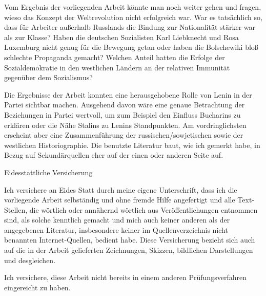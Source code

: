 \documentclass[12pt,headsepline,a4paper]{scrartcl}
\begin{document}
Vom Ergebnis der vorliegenden Arbeit könnte man noch weiter gehen und fragen, wieso das Konzept der Weltrevolution nicht erfolgreich war. War es tatsächlich so, dass für Arbeiter außerhalb Russlands die Bindung zur Nationalität stärker war als zur Klasse? Haben die deutschen Sozialisten Karl Liebknecht und Rosa Luxemburg nicht genug für die Bewegung getan oder haben die Bolschewiki bloß schlechte Propaganda gemacht? Welchen Anteil hatten die Erfolge der Sozialdemokratie in den westlichen Ländern an der relativen Immunität gegenüber dem Sozialismus?

Die Ergebnisse der Arbeit konnten eine herausgehobene Rolle von Lenin in der Partei sichtbar machen. Ausgehend davon wäre eine genaue Betrachtung der Beziehungen in Partei wertvoll, um zum Beispiel den Einfluss Bucharins zu erklären oder die Nähe Stalins zu Lenins Standpunkten.
Am vordringlichsten erscheint aber eine Zusammenführung der russischen/sowjetischen sowie der westlichen Historiographie. Die benutzte Literatur baut, wie ich gemerkt habe, in Bezug auf Sekundärquellen eher auf der einen oder anderen Seite auf. 

 
\newpage

%
\printbibliography
\newpage
{\Large Eidesstattliche Versicherung}

Ich versichere an Eides Statt durch meine eigene Unterschrift, dass ich die vorliegende Arbeit
selbständig und ohne fremde Hilfe angefertigt und alle Text-Stellen, die wörtlich oder
annähernd wörtlich aus Veröffentlichungen entnommen sind, als solche kenntlich gemacht
und mich auch keiner anderen als der angegebenen Literatur, insbesondere keiner im
Quellenverzeichnis nicht benannten Internet-Quellen, bedient habe. Diese Versicherung
bezieht sich auch auf die in der Arbeit gelieferten Zeichnungen, Skizzen, bildlichen
Darstellungen und desgleichen.

Ich versichere, diese Arbeit nicht bereits in einem anderen Prüfungsverfahren eingereicht zu
haben.
\end{document}
